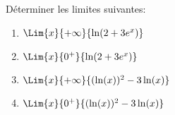 \documentclass{cornouaille}
\begin{document}
\begin{exercice}[Limites][5]
	Déterminer les limites suivantes:
	\begin{enumerate}
		\item $\Lim{x}{+\infty}{\ln(2+3e^x)}$\\
	\ldotcarreaux[6]
		\item $\Lim{x}{0^+}{\ln(2+3e^x)}$\\
	\ldotcarreaux[6]
		\item $\Lim{x}{+\infty}{(\ln(x))^2-3\ln(x)}$\\
	\ldotcarreaux[6]
			\item $\Lim{x}{0^+}{(\ln(x))^2-3\ln(x)}$\\
	\ldotcarreaux[6]
	\end{enumerate}
\end{exercice}
\newpage 
\end{document}

